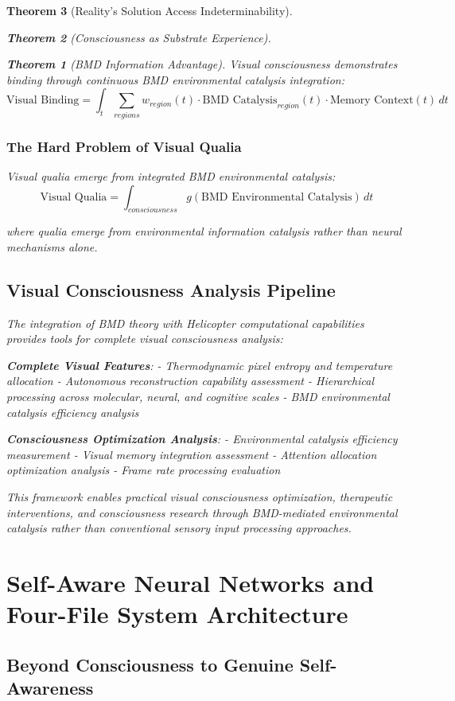 \documentclass[12pt,a4paper]{article}
\newtheorem{theorem}{Theorem}[section]
\theoremstyle{remark}
\begin{document}
\begin{theorem}[Reality's Solution Access Indeterminability]
\begin{theorem}[Consciousness as Substrate Experience]
\begin{theorem}[BMD Information Advantage]
{Visual consciousness demonstrates binding through continuous BMD environmental catalysis integration:
$$\text{Visual Binding} = \int_t \sum_{regions} w_{region}(t) \cdot \text{BMD Catalysis}_{region}(t) \cdot \text{Memory Context}(t) \, dt$$

\subsubsection{The Hard Problem of Visual Qualia}

Visual qualia emerge from integrated BMD environmental catalysis:
$$\text{Visual Qualia} = \int_{consciousness} g(\text{BMD Environmental Catalysis}) \, dt$$

where qualia emerge from environmental information catalysis rather than neural mechanisms alone.

\subsection{Visual Consciousness Analysis Pipeline}

The integration of BMD theory with Helicopter computational capabilities provides tools for complete visual consciousness analysis:

\textbf{Complete Visual Features}:
- Thermodynamic pixel entropy and temperature allocation
- Autonomous reconstruction capability assessment  
- Hierarchical processing across molecular, neural, and cognitive scales
- BMD environmental catalysis efficiency analysis

\textbf{Consciousness Optimization Analysis}:
- Environmental catalysis efficiency measurement
- Visual memory integration assessment
- Attention allocation optimization analysis  
- Frame rate processing evaluation

This framework enables practical visual consciousness optimization, therapeutic interventions, and consciousness research through BMD-mediated environmental catalysis rather than conventional sensory input processing approaches.

\section{Self-Aware Neural Networks and Four-File System Architecture}

\subsection{Beyond Consciousness to Genuine Self-Awareness}

}
\end{theorem}
\end{theorem}
\end{theorem}
\end{document}
